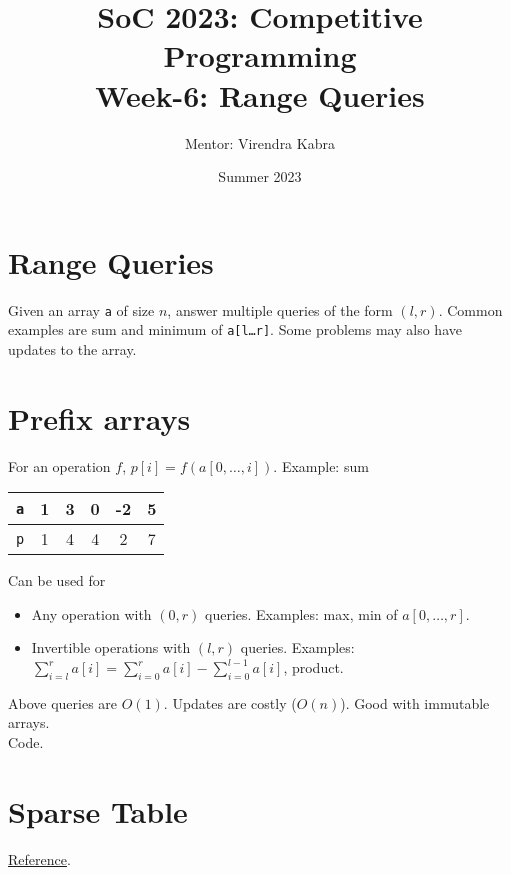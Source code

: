 \documentclass{article}
\title{\textbf{SoC 2023: Competitive Programming \\ {\Large Week-6: Range Queries}}}
\author{Mentor: Virendra Kabra}
\date{Summer 2023}
\newcommand{\T}[1]{\texttt{#1}}
\begin{document}
\begin{sloppypar}       %

    \maketitle
    \tableofcontents
    \thispagestyle{empty}

    \newpage

    \section{Range Queries}
    Given an array \T{a} of size $n$, answer multiple queries of the form $(l,r)$. Common examples are sum and minimum of \T{a[l\dots r]}. Some problems may also have updates to the array.

    \section{Prefix arrays}

    For an operation $f$, $p[i] = f(a[0,\dots,i])$. Example: sum

    \begin{center}
        \begin{tabular}{|c|c|c|c|c|c|}
            \hline
            \T{a} & 1 & 3 & 0 & -2 & 5 \\
            \hline
            \T{p} & 1 & 4 & 4 & 2 & 7 \\
            \hline
        \end{tabular}
    \end{center}

    \noindent Can be used for
    \begin{itemize}
        \item Any operation with $(0,r)$ queries. Examples: max, min of ${a[0,\dots,r]}$.
        \item Invertible operations with $(l,r)$ queries. Examples: $\sum_{i=l}^{r}a[i] = \sum_{i=0}^{r}a[i] - \sum_{i=0}^{l-1}a[i]$, product.
    \end{itemize}

    \noindent Above queries are $O(1)$. Updates are costly ($O(n)$). Good with immutable arrays.\\
    Code.

    \section{Sparse Table}
    \href{https://cp-algorithms.com/data_structures/sparse-table.html}{Reference}.


\end{sloppypar}
\end{document}
